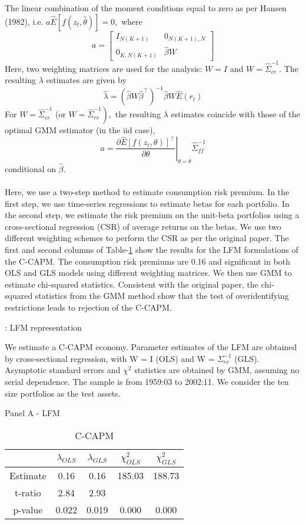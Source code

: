 \documentclass[11pt]{article}
\begin{document}
The linear combination of the moment conditions equal to zero as per Hansen (1982), i.e. $a \hat{E}\left[f\left(z_{t}, \hat{\theta}\right)\right]=0,$ where
$$
a=\left[\begin{array}{cc}
I_{N(K+1)} & 0_{N(K+1), N} \\
0_{K, N(K+1)} & \hat{\beta} W
\end{array}\right]
$$
Here, two weighting matrices are used for the analysis: $W=I$ and $W=\hat{\Sigma}_{c e}^{-1}$.
The resulting $\lambda$ estimates are given by
$$
\hat{\lambda}=\left(\hat{\beta} W \hat{\beta}^{\top}\right)^{-1} \hat{\beta} W \hat{E}\left(r_{t}\right)
$$
For $W=\hat{\Sigma}_{e e}^{-1}$ (or $\left.W=\hat{\Sigma}_{r r}^{-1}\right),$ the resulting $\lambda$ estimates coincide with those of the optimal
GMM estimator (in the iid case),
$$
a=\left.\frac{\partial \hat{E}\left[f\left(z_{t}, \theta\right)\right]^{\top}}{\partial \theta}\right|_{\theta=\theta} \hat{\Sigma}_{f f}^{-1}
$$
conditional on $\hat{\beta}$.


\paragraph{} Here, we use a two-step method to estimate consumption risk premium. In the first step, we use time-series regressions to estimate betas for each portfolio. In the second step, we estimate the risk premium on the unit-beta portfolios using a cross-sectional regression (CSR) of average returns on the betas. We use two different weighting schemes to perform the CSR as per the original paper. The first and second columns of Table-\ref{tab:table3} show the results for the LFM formulations of the C-CAPM. The consumption risk premiums are 0.16 and significant in both OLS and GLS models using different weighting matrices.  
We then use GMM to estimate chi-squared statistics. Consistent with the original paper, the chi-squared statistics from the GMM method show that the test of overidentifying restrictions leads to rejection of the C-CAPM.\\
 
 
\begin{table}[H]  
\centering
\caption{: LFM representation} \label{tab:table3}
\caption*{We estimate a C-CAPM economy. Parameter estimates of the LFM are obtained by cross-sectional regression, with W = I (OLS) and W = $\Sigma_{ee}^{-1}$ (GLS). Asymptotic standard errors and $\chi^{2}$ statistics are obtained by GMM, assuming no serial dependence. The sample is from 1959:03 to 2002:11. We consider the ten size portfolios as the test assets.}
\caption*{Panel A - LFM} 
\caption*{C-CAPM}

\begin{tabular}{ccccc}
\hline
         & $\lambda_{OLS}$  & $\lambda_{GLS}$  & $\chi_{OLS}^{2}$  & $\chi_{GLS}^{2}$  \\
\hline
Estimate & 0.16  & 0.16  & 185.03 & 188.73 \\
t-ratio  & 2.84  & 2.93  &        &        \\
p-value  & 0.022 & 0.019 & 0.000  & 0.000 \\
\hline
\end{tabular}
\end{table}
\end{document}
